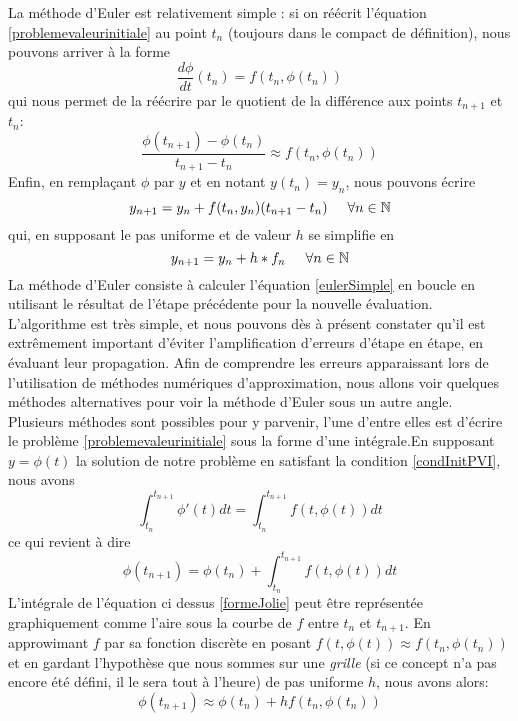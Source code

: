 \documentclass[12pt]{article}
\newcommand{\N}{\mathbb N}
\newcommand{\espace}{\hspace{5mm}}
\begin{document}
\quad La méthode d'Euler est relativement simple : si on réécrit l'équation \eqref{problemevaleurinitiale} au point $t_n$ (toujours dans le compact de définition), nous pouvons arriver à la forme
\begin{equation}
\frac{d\phi}{dt}(t_n) = f(t_n, \phi(t_n))
\end{equation}
qui nous permet de la réécrire par le quotient de la différence aux points $t_{n+1}$ et $t_n$:
\begin{equation}
\frac{\phi (t_{n+1}) - \phi(t_n)}{t_{n+1} - t_n} \approx f(t_n, \phi (t_n))
\end{equation}
Enfin, en remplaçant $\phi$ par $y$ et en notant $y(t_n) = y_n$, nous pouvons écrire
\begin{equation}
y_{n+1} = y_n + f(t_n, y_n)(t_{n+1} - t_n) \espace \forall n \in \N
\end{equation}
qui, en supposant le pas uniforme et de valeur $h$ se simplifie en
\begin{equation} \label{eulerSimple}
y_{n+1} = y_n + h*f_n \espace \forall n \in \N
\end{equation}
La méthode d'Euler consiste à calculer l'équation \eqref{eulerSimple} en boucle en utilisant le résultat de l'étape précédente pour la nouvelle évaluation. L'algorithme est très simple, et nous pouvons dès à présent constater qu'il est extrêmement important d'éviter l'amplification d'erreurs d'étape en étape, en évaluant leur propagation.
Afin de comprendre les erreurs apparaissant lors de l'utilisation de méthodes numériques d'approximation, nous allons voir quelques méthodes alternatives pour voir la méthode d'Euler sous un autre angle.
Plusieurs méthodes sont possibles pour y parvenir, l'une d'entre elles est d'écrire le problème \eqref{problemevaleurinitiale} sous la forme d'une intégrale.En supposant $y = \phi(t)$ la solution de notre problème en satisfant la condition \eqref{condInitPVI}, nous avons
\begin{equation}
\int_{t_n}^{t_{n+1}} \phi ' (t) dt = \int_{t_n}^{t_{n+1}} f(t, \phi(t)) dt
\end{equation}
ce qui revient à dire 
\begin{equation} \label{formeJolie}
\phi(t_{n+1}) = \phi(t_n) + \int_{t_n}^{t_{n+1}} f(t, \phi(t)) dt
\end{equation}
L'intégrale de l'équation ci dessus \eqref{formeJolie} peut être représentée graphiquement comme l'aire sous la courbe de $f$ entre $t_n$ et $t_{n+1}$. En approwimant $f$ par sa fonction discrète en posant $f(t, \phi(t)) \approx f(t_n, \phi(t_n))$ et en gardant l'hypothèse que nous sommes sur une \emph{grille} (si ce concept n'a pas encore été défini, il le sera tout à l'heure) de pas uniforme $h$, nous avons alors:
\begin{equation}
\phi(t_{n+1}) \approx \phi(t_n) + hf(t_n, \phi(t_n))
\end{equation}
\end{document}
